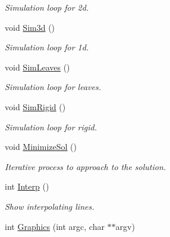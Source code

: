 \begin{DoxyCompactItemize}
\begin{DoxyCompactList}\small\item\em Simulation loop for 2d. \end{DoxyCompactList}\item 
void \hyperlink{classForces_a58f9413505ed155d74be878ac9648a41}{Sim3d} ()\hypertarget{classForces_a58f9413505ed155d74be878ac9648a41}{}\label{classForces_a58f9413505ed155d74be878ac9648a41}

\begin{DoxyCompactList}\small\item\em Simulation loop for 1d. \end{DoxyCompactList}\item 
void \hyperlink{classForces_aed42c487755c00ff4ddb916d6729da14}{Sim\+Leaves} ()\hypertarget{classForces_aed42c487755c00ff4ddb916d6729da14}{}\label{classForces_aed42c487755c00ff4ddb916d6729da14}

\begin{DoxyCompactList}\small\item\em Simulation loop for leaves. \end{DoxyCompactList}\item 
void \hyperlink{classForces_ab58dbf3583c50b0d8b0b9fbc35dfa4fa}{Sim\+Rigid} ()\hypertarget{classForces_ab58dbf3583c50b0d8b0b9fbc35dfa4fa}{}\label{classForces_ab58dbf3583c50b0d8b0b9fbc35dfa4fa}

\begin{DoxyCompactList}\small\item\em Simulation loop for rigid. \end{DoxyCompactList}\item 
void \hyperlink{classForces_a4a0ed3bb2c5155bda06158b0e918cd34}{Minimize\+Sol} ()\hypertarget{classForces_a4a0ed3bb2c5155bda06158b0e918cd34}{}\label{classForces_a4a0ed3bb2c5155bda06158b0e918cd34}

\begin{DoxyCompactList}\small\item\em Iterative process to approach to the solution. \end{DoxyCompactList}\item 
int \hyperlink{classForces_ae411df3ab40a4d3b604548c9afa0a8f4}{Interp} ()\hypertarget{classForces_ae411df3ab40a4d3b604548c9afa0a8f4}{}\label{classForces_ae411df3ab40a4d3b604548c9afa0a8f4}

\begin{DoxyCompactList}\small\item\em Show interpolating lines. \end{DoxyCompactList}\item 
int \hyperlink{classForces_a7411c318f14258f65a45ba2572697aa2}{Graphics} (int argc, char $\ast$$\ast$argv)\hypertarget{classForces_a7411c318f14258f65a45ba2572697aa2}{}\label{classForces_a7411c318f14258f65a45ba2572697aa2}


\end{DoxyCompactItemize}
